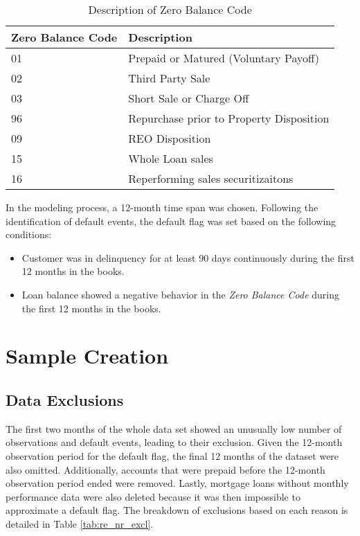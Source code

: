 \begin{table}[H]
\centering
\begin{tabular}{ l l }\toprule
\textbf{Zero Balance Code} & \textbf{Description}            \\\midrule
01                & Prepaid or Matured (Voluntary Payoff)    \\
02                & Third Party Sale                         \\
03                & Short Sale or Charge Off                 \\
96                & Repurchase prior to Property Disposition \\
09                & REO Disposition                          \\
15                & Whole Loan sales                         \\
16                & Reperforming sales securitizaitons \\\bottomrule
\end{tabular}%
\caption{Description of Zero Balance Code}
\label{tab:re_ZB_Descr}
\end{table}

In the modeling process, a 12-month time span was chosen. Following the identification of default events, the default flag was set based on the following conditions:

\begin{itemize}
  \item Customer was in delinquency for at least 90 days continuously during the first 12 months in the books.
  \item Loan balance showed a negative behavior in the \emph{Zero Balance Code} during the first 12 months in the books.
\end{itemize}

\section{Sample Creation}

\subsection{Data Exclusions}
The first two months of the whole data set showed an unusually low number of observations and default events, leading to their exclusion. Given the 12-month observation period for the default flag, the final 12 months of the dataset were also omitted. Additionally, accounts that were prepaid before the 12-month observation period ended were removed. Lastly, mortgage loans without monthly performance data were also deleted because it was then impossible to approximate a default flag. The breakdown of exclusions based on each reason is detailed in Table \ref{tab:re_nr_excl}.

